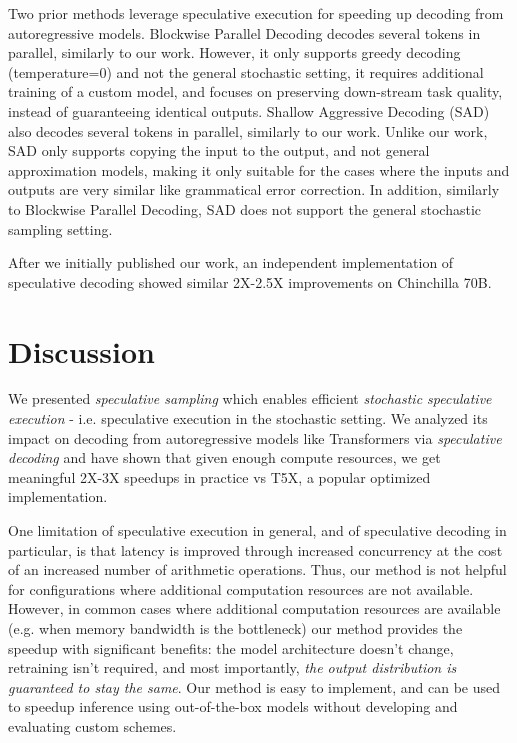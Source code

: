 Two prior methods leverage speculative execution for speeding up decoding from autoregressive models. Blockwise Parallel Decoding \citep{Blockwise_Parallel_Decoding} decodes several tokens in parallel, similarly to our work. However, it only supports greedy decoding (temperature=0) and not the general stochastic setting, it requires additional training of a custom model, and focuses on preserving down-stream task quality, instead of guaranteeing identical outputs. Shallow Aggressive Decoding (SAD) \citep{sad} also decodes several tokens in parallel, similarly to our work. Unlike our work, SAD only supports copying the input to the output, and not general approximation models, making it only suitable for the cases where the inputs and outputs are very similar like grammatical error correction. In addition, similarly to Blockwise Parallel Decoding, SAD does not support the general stochastic sampling setting.

After we initially published our work, an independent implementation of speculative decoding \citep{chen2023accelerating} showed similar 2X-2.5X improvements on Chinchilla 70B.


\section{Discussion}

We presented \emph{speculative sampling} which enables efficient \emph{stochastic speculative execution} - i.e. speculative execution in the stochastic setting. We analyzed its impact on decoding from autoregressive models like Transformers via \emph{speculative decoding} and have shown that given enough compute resources, we get meaningful 2X-3X speedups in practice vs T5X, a popular optimized implementation.

One limitation of speculative execution in general, and of speculative decoding in particular, is that latency is improved through increased concurrency at the cost of an increased number of arithmetic operations. Thus, our method is not helpful for configurations where additional computation resources are not available. However, in common cases where additional computation resources are available (e.g. when memory bandwidth is the bottleneck) our method provides the speedup with significant benefits: the model architecture doesn't change, retraining isn't required, and most importantly, \emph{the output distribution is guaranteed to stay the same}. Our method is easy to implement, and can be used to speedup inference using out-of-the-box models without developing and evaluating custom schemes.

